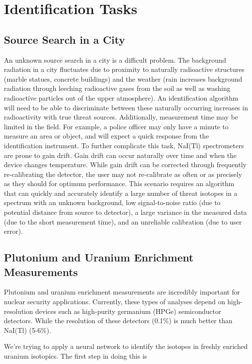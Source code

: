 \documentclass[thesis,tocnosub,noragright,centerchapter,12pt,fullpage]{uiucecethesis09}
\begin{document}
\section{Identification Tasks}

\subsection{Source Search in a City}
An unknown source search in a city is a difficult problem. The background radiation in a city fluctuates due to proximity to naturally radioactive structures (marble statues, concrete buildings) and the weather (rain increases background radiation through leeching radioactive gases from the soil as well as washing radioactive particles out of the upper atmosphere). An identification algorithm will need to be able to discriminate between these naturally occurring increases in radioactivity with true threat sources. Additionally, measurement time may be limited in the field. For example, a police officer may only have a minute to measure an area or object, and will expect a quick response from the identification instrument. To further complicate this task, NaI(Tl) spectrometers are prone to gain drift. Gain drift can occur naturally over time and when the device changes temperature. While gain drift can be corrected through frequently re-calibrating the detector, the user may not re-calibrate as often or as precisely as they should for optimum performance. This scenario requires an algorithm that can quickly and accurately identify a large number of threat isotopes in a spectrum with an unknown background, low signal-to-noise ratio (due to potential distance from source to detector), a large variance in the measured data (due to the short measurement time), and an unreliable calibration (due to user error).

\subsection{Plutonium and Uranium Enrichment Measurements}


Plutonium and uranium enrichment measurements are incredibly important for nuclear security applications. Currently, these types of analyses depend on high-resolution devices such as high-purity germanium (HPGe) semiconductor detectors. While the resolution of these detectors (0.1\%) is much better than NaI(Tl) (5-6\%).

We're trying to apply a neural network to identify the isotopes in freshly enriched uranium isotopics. The first step in doing this is 
\end{document}
